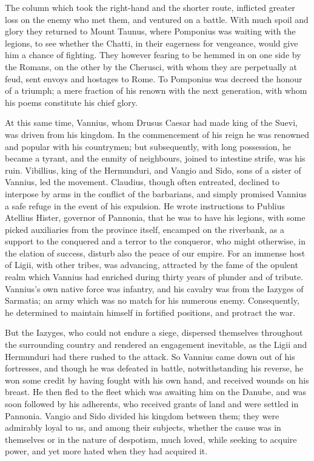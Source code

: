 
The column which took the right-hand and the shorter route, inflicted greater loss on the enemy who met them, and ventured on a battle. With much spoil and glory they returned to Mount Taunus, where Pomponius was waiting with the legions, to see whether the Chatti, in their eagerness for vengeance, would give him a chance of fighting. They however fearing to be hemmed in on one side by the Romans, on the other by the Cherusci, with whom they are perpetually at feud, sent envoys and hostages to Rome. To Pomponius was decreed the honour of a triumph; a mere fraction of his renown with the next generation, with whom his poems constitute his chief glory.


At this same time, Vannius, whom Drusus Caesar had made king of the Suevi, was driven from his kingdom. In the commencement of his reign he was renowned and popular with his countrymen; but subsequently, with long possession, he became a tyrant, and the enmity of neighbours, joined to intestine strife, was his ruin. Vibillius, king of the Hermunduri, and Vangio and Sido, sons of a sister of Vannius, led the movement. Claudius, though often entreated, declined to interpose by arms in the conflict of the barbarians, and simply promised Vannius a safe refuge in the event of his expulsion. He wrote instructions to Publius Atellius Hister, governor of Pannonia, that he was to have his legions, with some picked auxiliaries from the province itself, encamped on the riverbank, as a support to the conquered and a terror to the conqueror, who might otherwise, in the elation of success, disturb also the peace of our empire. For an immense host of Ligii, with other tribes, was advancing, attracted by the fame of the opulent realm which Vannius had enriched during thirty years of plunder and of tribute. Vannius's own native force was infantry, and his cavalry was from the Iazyges of Sarmatia; an army which was no match for his numerous enemy. Consequently, he determined to maintain himself in fortified positions, and protract the war.


But the Iazyges, who could not endure a siege, dispersed themselves throughout the surrounding country and rendered an engagement inevitable, as the Ligii and Hermunduri had there rushed to the attack. So Vannius came down out of his fortresses, and though he was defeated in battle, notwithstanding his reverse, he won some credit by having fought with his own hand, and received wounds on his breast. He then fled to the fleet which was awaiting him on the Danube, and was soon followed by his adherents, who received grants of land and were settled in Pannonia. Vangio and Sido divided his kingdom between them; they were admirably loyal to us, and among their subjects, whether the cause was in themselves or in the nature of despotism, much loved, while seeking to acquire power, and yet more hated when they had acquired it.

